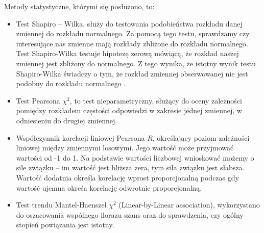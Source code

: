 \documentclass[a4paper,12pt,twoside,openright]{mwrep}
\begin{document}
\vspace{\baselineskip} 

Metody statystyczne, którymi się posłużono, to:
\begin{itemize}
     \item Test Shapiro – Wilka, służy do testowania podobieństwa rozkładu danej zmiennej do rozkładu normalnego. Za pomocą tego testu, sprawdzamy czy interesujące nas zmienne mają rozkłady zbliżone do rozkładu normalnego. Test Shapiro-Wilka testuje hipotezę zerową mówiącą, że rozkład naszej zmiennej jest zbliżony do normalnego. Z tego wynika, że istotny wynik testu Shapiro-Wilka świadczy o tym, że rozkład zmiennej obserwowanej nie jest podobny do rozkładu normalnego \cite{ShapWilk}. 
    
     \item Test Pearsona $\chi^2$, to test nieparametryczny, służący do oceny zależności pomiędzy rozkładem częstości odpowiedzi w zakresie jednej zmiennej, w odniesieniu do drugiej zmiennej.
     
     \item Współczynnik korelacji liniowej Pearsona $R$, określający poziom zależności liniowej między zmiennymi losowymi. Jego wartość może przyjmować wartości od -1 do 1. Na podstawie wartości liczbowej wnioskować możemy o sile związku – im wartość jest bliższa zera, tym siła związku jest słabsza. Wartość dodatnia określa korelację wprost proporcjonalną podczas gdy wartość ujemna okreśa korelację odwrotnie proporcjonalną.
     
     \item Test trendu Mantel-Haenszel $\chi^2$ (Linear-by-Linear association)\cite{mantel}, wykorzystano do oszacowania wspólnego ilorazu szans oraz do sprawdzenia, czy ogólny stopień powiązania jest istotny.
     
%    
     
\end{itemize}
\end{document}
